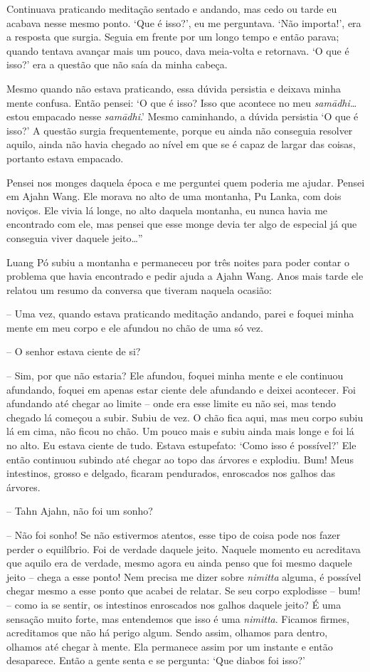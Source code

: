 Continuava praticando meditação sentado e andando, mas cedo ou tarde eu
acabava nesse mesmo ponto. `Que é isso?', eu me perguntava. `Não
importa!', era a resposta que surgia. Seguia em frente por um longo
tempo e então parava; quando tentava avançar mais um pouco, dava
meia-volta e retornava. `O que é isso?' era a questão que não saía da
minha cabeça.

Mesmo quando não estava praticando, essa dúvida persistia e deixava
minha mente confusa. Então pensei: `O que é isso? Isso que acontece no
meu \emph{samādhi\ldots{}} estou empacado nesse \emph{samādhi}.' Mesmo
caminhando, a dúvida persistia `O que é isso?' A questão surgia
frequentemente, porque eu ainda não conseguia resolver aquilo, ainda não
havia chegado ao nível em que se é capaz de largar das coisas, portanto
estava empacado.

Pensei nos monges daquela época e me perguntei quem poderia me ajudar.
Pensei em Ajahn Wang. Ele morava no alto de uma montanha, Pu Lanka, com
dois noviços. Ele vivia lá longe, no alto daquela montanha, eu nunca
havia me encontrado com ele, mas pensei que esse monge devia ter algo de
especial já que conseguia viver daquele jeito\ldots{}''

Luang Pó subiu a montanha e permaneceu por três noites para poder contar
o problema que havia encontrado e pedir ajuda a Ajahn Wang. Anos mais
tarde ele relatou um resumo da conversa que tiveram naquela ocasião:

 -- Uma vez, quando estava praticando meditação andando,
parei e foquei minha mente em meu corpo e ele afundou no chão de uma só
vez.

 -- O senhor estava ciente de si?

-- Sim, por que não estaria? Ele afundou, foquei minha mente e ele
continuou afundando, foquei em apenas estar ciente dele afundando e
deixei acontecer. Foi afundando até chegar ao limite -- onde era esse
limite eu não sei, mas tendo chegado lá começou a subir. Subiu de vez. O
chão fica aqui, mas meu corpo subiu lá em cima, não ficou no chão. Um
pouco mais e subiu ainda mais longe e foi lá no alto. Eu estava ciente
de tudo. Estava estupefato: `Como isso é possível?' Ele então continuou
subindo até chegar ao topo das árvores e explodiu. Bum! Meus intestinos,
grosso e delgado, ficaram pendurados, enroscados nos galhos das árvores.

-- Tahn Ajahn, não foi um sonho?

-- Não foi sonho! Se não estivermos atentos, esse tipo de coisa pode nos
fazer perder o equilíbrio. Foi de verdade daquele jeito. Naquele momento
eu acreditava que aquilo era de verdade, mesmo agora eu ainda penso que
foi mesmo daquele jeito -- chega a esse ponto! Nem precisa me dizer
sobre \emph{nimitta} alguma, é possível chegar mesmo a esse ponto que
acabei de relatar. Se seu corpo explodisse -- bum! -- como ia se sentir,
os intestinos enroscados nos galhos daquele jeito? É uma sensação muito
forte, mas entendemos que isso é uma \emph{nimitta}. Ficamos firmes,
acreditamos que não há perigo algum. Sendo assim, olhamos para dentro,
olhamos até chegar à mente. Ela permanece assim por um instante e então
desaparece. Então a gente senta e se pergunta: `Que diabos foi isso?'


